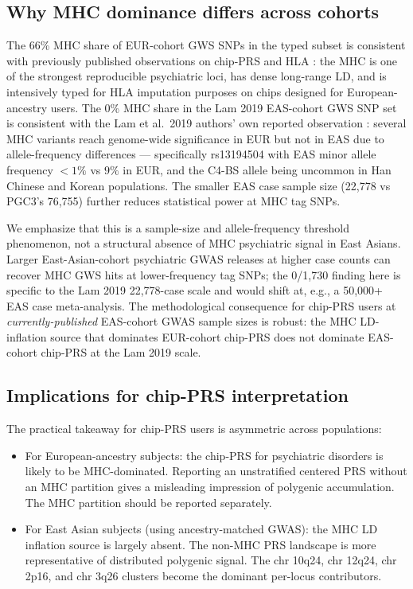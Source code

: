 \documentclass[11pt,a4paper]{article}
\begin{document}
\subsection{Why MHC dominance differs across cohorts}
The 66\% MHC share of EUR-cohort GWS SNPs in the typed subset is consistent with previously published observations on chip-PRS and HLA \cite{trubetskoy2022,sekar2016}: the MHC is one of the strongest reproducible psychiatric loci, has dense long-range LD, and is intensively typed for HLA imputation purposes on chips designed for European-ancestry users. The 0\% MHC share in the Lam 2019 EAS-cohort GWS SNP set is consistent with the Lam et al.~2019 authors' own reported observation \cite{lam2019}: several MHC variants reach genome-wide significance in EUR but not in EAS due to allele-frequency differences --- specifically rs13194504 with EAS minor allele frequency $<1\%$ vs $9\%$ in EUR, and the C4-BS allele being uncommon in Han Chinese and Korean populations. The smaller EAS case sample size (22{,}778 vs PGC3's 76{,}755) further reduces statistical power at MHC tag SNPs.

We emphasize that this is a sample-size and allele-frequency threshold phenomenon, not a structural absence of MHC psychiatric signal in East Asians. Larger East-Asian-cohort psychiatric GWAS releases at higher case counts can recover MHC GWS hits at lower-frequency tag SNPs; the 0/1{,}730 finding here is specific to the Lam 2019 22{,}778-case scale and would shift at, e.g., a 50{,}000+ EAS case meta-analysis. The methodological consequence for chip-PRS users at \emph{currently-published} EAS-cohort GWAS sample sizes is robust: the MHC LD-inflation source that dominates EUR-cohort chip-PRS does not dominate EAS-cohort chip-PRS at the Lam 2019 scale.

\subsection{Implications for chip-PRS interpretation}
The practical takeaway for chip-PRS users is asymmetric across populations:
\begin{itemize}
\item For European-ancestry subjects: the chip-PRS for psychiatric disorders is likely to be MHC-dominated. Reporting an unstratified centered PRS without an MHC partition gives a misleading impression of polygenic accumulation. The MHC partition should be reported separately.
\item For East Asian subjects (using ancestry-matched GWAS): the MHC LD inflation source is largely absent. The non-MHC PRS landscape is more representative of distributed polygenic signal. The chr 10q24, chr 12q24, chr 2p16, and chr 3q26 clusters become the dominant per-locus contributors.
\end{itemize}
\end{document}
